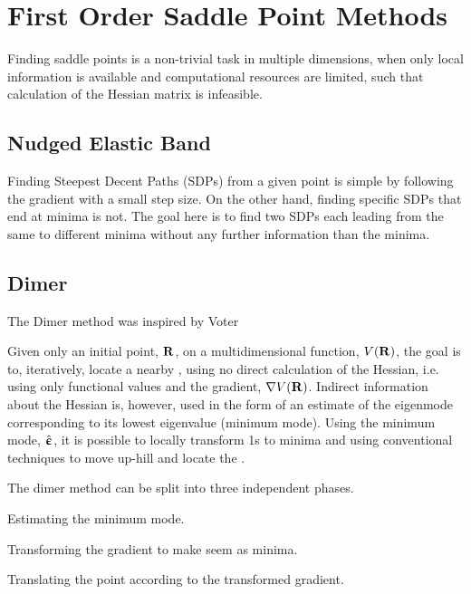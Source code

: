\section{First Order Saddle Point Methods}
\label{sec:sps}

Finding saddle points is a non-trivial task in multiple dimensions, when only local information is available and computational resources are limited, such that calculation of the Hessian matrix is infeasible.

\incomplete

\subsection{Nudged Elastic Band}
\label{sec:neb}

Finding Steepest Decent Paths (SDPs) from a given point is simple by following the gradient with a small step size.
On the other hand, finding specific SDPs that end at minima is not.
The goal here is to find two SDPs each leading from the same  to different minima without any further information than the minima.


\incomplete

\subsection{Dimer}
\label{sec:dimer}

The Dimer method was inspired by Voter\cite{voter-hyperdynamics-1997}

Given only an initial point, ${\mathrm{\mathbf{\bm{R}}}}$, on a multidimensional function, $V({\mathrm{\mathbf{\bm{R}}}})$, the goal is to, iteratively, locate a nearby , using no direct calculation of the Hessian, i.e. using only functional values and the gradient, $\nabla V({\mathrm{\mathbf{\bm{R}}}})$.
Indirect information about the Hessian is, however, used in the form of an estimate of the eigenmode corresponding to its lowest eigenvalue (minimum mode).
Using the minimum mode, $\hat{{\mathrm{\mathbf{\bm{\upepsilon}}}}}$, it is possible to locally transform \sap1s to minima and using conventional techniques to move up-hill and locate the .

The dimer method can be split into three independent phases.
\item Estimating the minimum mode.
\item Transforming the gradient to make  seem as minima.
\item Translating the point according to the transformed gradient.
\een


